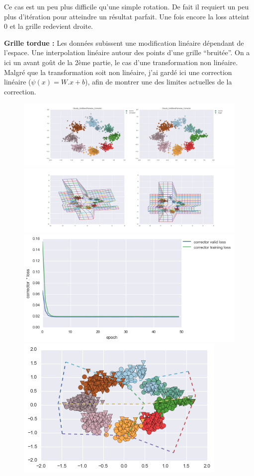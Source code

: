 Ce cas est un peu plus difficile qu'une simple rotation. De fait il requiert un peu plus d'itération pour
atteindre un résultat parfait. Une fois encore la loss atteint 0 et la grille redevient droite.


{\Large \textbf{Grille tordue :}} Les données subissent une modification linéaire dépendant de l'espace.
Une interpolation linéaire autour des points d'une grille ``bruitée''.
On a ici un avant goût de la 2ème partie, le cas d'une transformation non linéaire.
Malgré que la transformation soit non linéaire, j'ai gardé ici une correction linéaire ($\psi(x) = W.x+b$),
afin de montrer une des limites actuelles de la correction.

\begin{figure}[H] %
\centering
\includegraphics[width=\linewidth]{fig/24-05-2016/clouds/Clouds_GridBendPairwise_Corrector-DATA.png}
\includegraphics[width=\linewidth]{fig/24-05-2016/clouds/Clouds_GridBendPairwise_Corrector-GridCheck.png}
\includegraphics[width=0.45\linewidth]{fig/24-05-2016/clouds/Clouds_GridBendPairwise_Corrector-Learning_curve.png}
\includegraphics[width=0.45\linewidth]{fig/24-05-2016/clouds/cloud_grid.png}

\end{figure}
